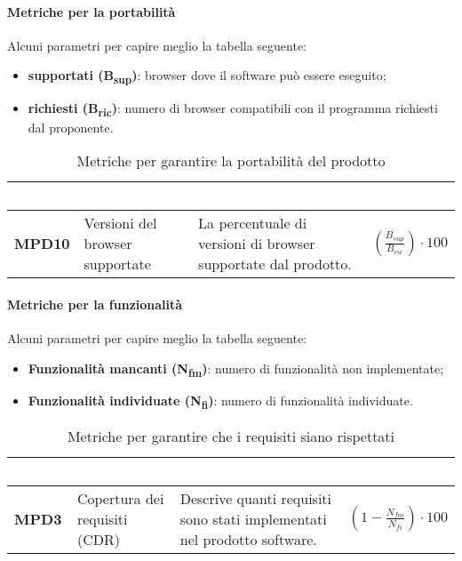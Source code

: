 \paragraph{Metriche per la portabilità}
Alcuni parametri per capire meglio la tabella seguente:
\begin{itemize}
\item \textbf{ supportati (B\textsubscript{sup})}: browser dove il software può essere eseguito;
	\item \textbf{ richiesti (B\textsubscript{ric})}: numero di browser compatibili con il programma richiesti dal proponente.
\end{itemize}
\newpage
\renewcommand{\arraystretch}{1.5}
\renewcommand\extrarowheight{1.5pt}
\begin{longtable}{C{1.5cm} C{4.5cm} C{5.5cm} C{5cm}}
		\textcolor{white}{\textbf{Codice}} & 
		\textcolor{white}{\textbf{Nome}} & 
		\textcolor{white}{\textbf{Descrizione}} & 
		\textcolor{white}{\textbf{Formula}} \\
		\endfirsthead
	    \endfoot
	    \caption{Metriche per garantire la portabilità del prodotto}
	    \endlastfoot
		\textbf{MPD10} & 
		Versioni del browser supportate & 
		La percentuale di versioni di browser supportate dal prodotto. &
		$(\frac{B_{sup}}{B_{ric}}) \cdot 100 $  \\
\end{longtable} 

\paragraph{Metriche per la funzionalità}

Alcuni parametri per capire meglio la tabella seguente:
\begin{itemize}
\item \textbf{Funzionalità mancanti (N\textsubscript{fm})}: numero di funzionalità non implementate;
\item \textbf{Funzionalità individuate (N\textsubscript{fi})}: numero di funzionalità individuate.

\end{itemize}
\renewcommand{\arraystretch}{1.5}
\renewcommand\extrarowheight{1.5pt}
\begin{longtable}{C{1.5cm} C{4.5cm} C{5.5cm} C{5cm}}
		\textcolor{white}{\textbf{Codice}} & 
		\textcolor{white}{\textbf{Nome}} & 
		\textcolor{white}{\textbf{Descrizione}} & 
		\textcolor{white}{\textbf{Formula}} \\
		\endfirsthead
	    \endfoot
	    \caption{Metriche per garantire che i requisiti siano rispettati}
	    \endlastfoot
		\textbf{MPD3} & 
		Copertura dei requisiti (CDR) & 
		Descrive quanti requisiti sono stati implementati nel prodotto software. &
		$(1 - \frac{N_{fm}}{N_{fi}}) \cdot 100 $ \\
\end{longtable} 

